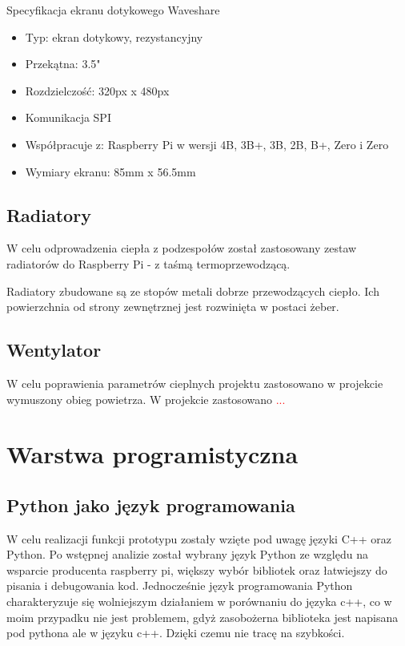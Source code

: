 \documentclass[a4paper,12pt,reqno]{article}
\begin{document}
Specyfikacja ekranu dotykowego Waveshare

\begin{itemize}
	\item Typ: ekran dotykowy, rezystancyjny
	\item Przekątna: 3.5"
	\item Rozdzielczość: 320px x 480px
	\item Komunikacja SPI
	\item Współpracuje z: Raspberry Pi w wersji 4B, 3B+, 3B, 2B, B+, Zero i Zero
	\item Wymiary ekranu: 85mm x 56.5mm
\end{itemize}

\subsection{Radiatory}

W celu odprowadzenia ciepła z podzespołów został zastosowany zestaw radiatorów do Raspberry Pi - z taśmą termoprzewodzącą.

Radiatory zbudowane są ze stopów metali dobrze przewodzących ciepło. Ich powierzchnia od strony zewnętrznej jest rozwinięta w postaci żeber.

\subsection{Wentylator}

W celu poprawienia parametrów cieplnych projektu zastosowano w projekcie wymuszony obieg powietrza. W projekcie zastosowano \textcolor{red}{...}

\newpage
\section{Warstwa programistyczna} \label{section:warstwa_programistyczna}
\subsection{Python jako język programowania}
W celu realizacji funkcji prototypu zostały wzięte pod uwagę języki C++ oraz Python. Po wstępnej analizie został wybrany język Python ze względu na \textcolor{new}{wsparcie producenta raspberry pi, większy wybór bibliotek oraz łatwiejszy do pisania i debugowania kod}. Jednocześnie język programowania Python charakteryzuje się \textcolor{new}{wolniejszym działaniem w porównaniu do języka c++, co w moim przypadku nie jest problemem, gdyż zasobożerna biblioteka jest napisana pod pythona ale w języku c++. Dzięki czemu nie tracę na szybkości}.
\end{document}
